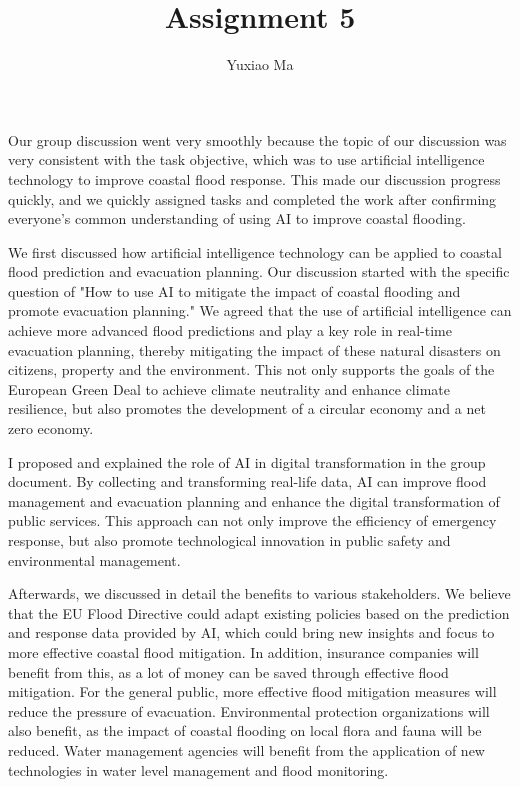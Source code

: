 \documentclass[UTF8,a4paper,AutoFakeBold,AutoFakeSlant]{article}
\title{\textbf{\textsf{{\textsf{Assignment 5}}}}}
\author{\tnewroman Yuxiao Ma}
\date{}
\begin{document}
\maketitle



Our group discussion went very smoothly because the topic of our discussion was very consistent with the task objective, which was to use artificial intelligence technology to improve coastal flood response. This made our discussion progress quickly, and we quickly assigned tasks and completed the work after confirming everyone's common understanding of using AI to improve coastal flooding.

We first discussed how artificial intelligence technology can be applied to coastal flood prediction and evacuation planning. Our discussion started with the specific question of "How to use AI to mitigate the impact of coastal flooding and promote evacuation planning." We agreed that the use of artificial intelligence can achieve more advanced flood predictions and play a key role in real-time evacuation planning, thereby mitigating the impact of these natural disasters on citizens, property and the environment. This not only supports the goals of the European Green Deal to achieve climate neutrality and enhance climate resilience, but also promotes the development of a circular economy and a net zero economy.

I proposed and explained the role of AI in digital transformation in the group document. By collecting and transforming real-life data, AI can improve flood management and evacuation planning and enhance the digital transformation of public services. This approach can not only improve the efficiency of emergency response, but also promote technological innovation in public safety and environmental management.

Afterwards, we discussed in detail the benefits to various stakeholders. We believe that the EU Flood Directive could adapt existing policies based on the prediction and response data provided by AI, which could bring new insights and focus to more effective coastal flood mitigation. In addition, insurance companies will benefit from this, as a lot of money can be saved through effective flood mitigation. For the general public, more effective flood mitigation measures will reduce the pressure of evacuation. Environmental protection organizations will also benefit, as the impact of coastal flooding on local flora and fauna will be reduced. Water management agencies will benefit from the application of new technologies in water level management and flood monitoring.
\end{document}
